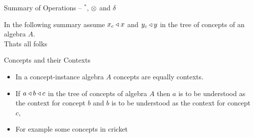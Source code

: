 \begin{frame}{Summary of Operations -- $^*$, $\otimes$ and $\delta$}

In the following summary assume $x_c \triangleleft x$ and $y_c \triangleleft y$ in the tree of concepts of an algebra $A$. \\
\medskip
{}
\pause Thats all folks
\end{frame}

\begin{frame}{Concepts and their Contexts}
\begin{itemize}
\item In a concept-instance algebra $A$ concepts are equally contexts.
\item If $a \triangleleft b \triangleleft c$ in the tree of concepts of algebra $A$ 
then $a$ is to be understood as the context for concept $b$ and $b$ is to be understood as the context for concept $c$,
\item For example some concepts in cricket

\end{itemize} 
\end{frame}

